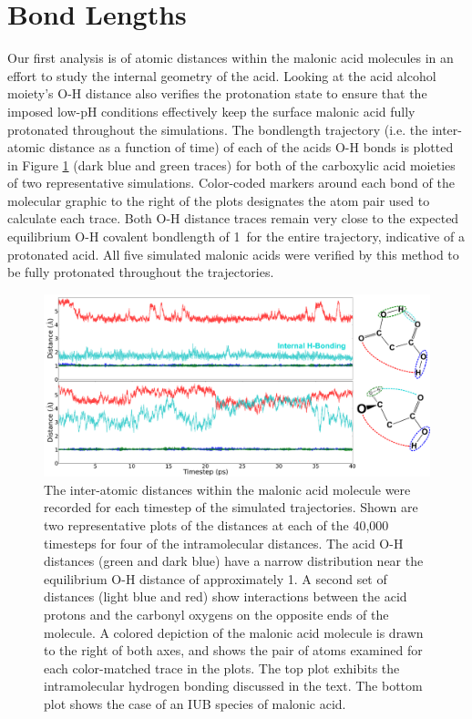 \section{Bond Lengths}

Our first analysis is of atomic distances within the malonic acid molecules in an effort to study the internal geometry of the acid. Looking at the acid alcohol moiety's O-H distance also verifies the protonation state to ensure that the imposed low-pH conditions effectively keep the surface malonic acid fully protonated throughout the simulations. The bondlength trajectory (i.e. the inter-atomic distance as a function of time) of each of the acids O-H bonds is plotted in Figure \ref{fig:bondlength-trajectory} (dark blue and green traces) for both of the carboxylic acid moieties of two representative simulations. Color-coded markers around each bond of the molecular graphic to the right of the plots designates the atom pair used to calculate each trace. Both O-H distance traces remain very close to the expected equilibrium O-H covalent bondlength of 1\angs~for the entire trajectory, indicative of a protonated acid. All five simulated malonic acids were verified by this method to be fully protonated throughout the trajectories.

\begin{figure}[h!]
	\begin{center}
		\includegraphics[scale=1.0]{images/bond-length/bondlengths.png}
		\caption{The inter-atomic distances within the malonic acid molecule were recorded for each timestep of the simulated trajectories. Shown are two representative plots of the distances at each of the 40,000 timesteps for four of the intramolecular distances. The acid O-H distances (green and dark blue) have a narrow distribution near the equilibrium O-H distance of approximately 1\angs. A second set of distances (light blue and red) show interactions between the acid protons and the carbonyl oxygens on the opposite ends of the molecule. A colored depiction of the malonic acid molecule is drawn to the right of both axes, and shows the pair of atoms examined for each color-matched trace in the plots. The top plot exhibits the intramolecular hydrogen bonding discussed in the text. The bottom plot shows the case of an IUB species of malonic acid.}
		\label{fig:bondlength-trajectory}
	\end{center}
\end{figure}

